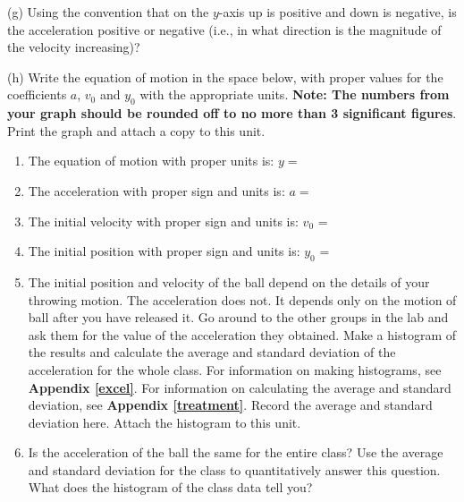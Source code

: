 (g) Using the convention that on the $y$-axis up is positive and down is negative, is the acceleration positive or negative (i.e., in what direction is the magnitude of the velocity increasing)?
\vspace{20mm}

(h) Write the equation of motion in the space below, with proper values for the coefficients 
$a$, \( v_{0} \) and \( y_{0} \) with the appropriate units. \textbf{Note: The numbers from 
your graph should be rounded off to no more than 3 significant figures}. Print the graph and 
attach a copy to this unit. 

\begin{enumerate}
\item The equation of motion with proper units is: $y =$\vspace{5mm}

\item The acceleration with proper sign and units is: $a =$ \vspace{5mm}

\item The initial velocity with proper sign and units is: \(v_{0} \) = \vspace{5mm}

\item The initial position with proper sign and units is: \(y_{0} \) = \vspace{5mm}

\item The initial position and velocity of the ball depend on the details of your throwing motion. 
The acceleration does not.
It depends only on the motion of ball after you have released it.
Go around to the other groups in the lab and ask them for the value of the acceleration they obtained.
Make a histogram of the results and calculate the average and standard deviation of the acceleration for the whole class.
For information on making histograms, see \textbf{Appendix \ref{excel}}. For information on calculating the average and
standard deviation, see \textbf{Appendix \ref{treatment}}. Record the average and standard deviation here.
Attach the histogram to this unit.
\vspace{15mm}

\item Is the acceleration of the ball the same for the entire class? Use the average and standard deviation for the class to quantitatively answer this question. What does the histogram of the class data tell you?
\vspace{15mm}

\end{enumerate}
